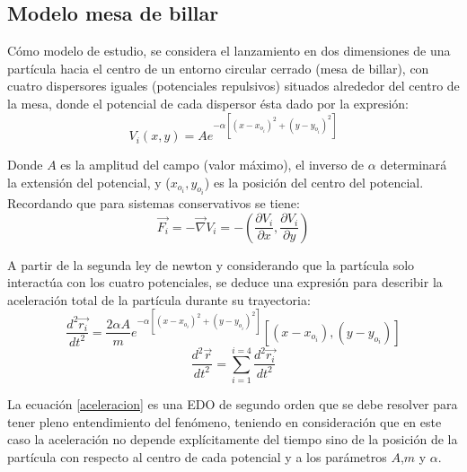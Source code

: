 \documentclass[11pt,letterpaper,twocolumn]{article}
\begin{document}
\subsection*{Modelo mesa de billar}
Cómo modelo de estudio, se considera el lanzamiento en dos dimensiones de una partícula hacia el centro de un entorno circular cerrado (mesa de billar), con cuatro dispersores iguales (potenciales repulsivos) situados alrededor del centro de la mesa, donde el potencial de cada dispersor ésta dado por la expresión:\\
$$V_{i}(x,y)=A e^{-\alpha[ (x-x_{o_{i}})^{2} + (y-y_{o_{i}})^{2} ]}$$  
\par 
Donde $A$ es la amplitud del campo (valor máximo), el inverso de $\alpha$ determinará la extensión del potencial, y ($x_{o_{i}},y_{o_{i}}$) es la posición del centro del potencial. Recordando que para sistemas conservativos se tiene:
$$\vec{F_{i}}=- \vec{\nabla}V_{i}=- (\dfrac{\partial V_{i}}{\partial x},\dfrac{\partial V_{i}}{\partial y})$$ 
\par 
A partir de la segunda ley de newton y considerando que la partícula solo interactúa con los cuatro potenciales, se deduce una expresión para describir la aceleración total de la partícula durante su trayectoria:
$$\dfrac{d^{2}\vec{r_{i}}}{dt^{2}}=\dfrac{2 \alpha A}{m} e^{-\alpha[ (x-x_{o_{i}})^{2} + (y-y_{o_{i}})^{2} ]} [(x-x_{o_{i}}),(y-y_{o_{i}})]$$
\begin{equation}
\dfrac{d^{2}\vec{r}}{dt^{2}} = \sum_{i=1}^{i=4} \dfrac{d^{2}\vec{r_{i}}}{dt^{2}}
\label{aceleracion}
\end{equation}
\par 
La ecuación \ref{aceleracion} es una EDO de segundo orden que se debe resolver para tener pleno entendimiento del fenómeno, teniendo en consideración que en este caso la aceleración no depende explícitamente del tiempo sino de la posición de la partícula con respecto al centro de cada potencial y a los parámetros $A$,$m$ y $\alpha$.\\
\end{document}
